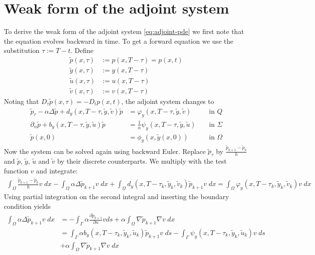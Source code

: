 \documentclass[
12pt, %
a4paper, %
onecolumn, %
portrait %
]{article}
\begin{document}
\section{Weak form of the adjoint system}
To derive the weak form of the adjoint system \eqref{eq:adjoint-pde} we first note that the equation evolves backward in time. To get a forward equation we use the substitution $\tau := T - t$.
Define
\begin{align*}
\tilde{p}(x,\tau) &:= p(x,T-\tau) = p(x,t) \\
\tilde{y}(x,\tau) &:= y(x,T-\tau) \\
\tilde{u}(x,\tau) &:= u(x,T-\tau) \\
\tilde{v}(x,\tau) &:= v(x,T-\tau)
\end{align*}
Noting that $D_{\tau}\tilde{p}(x,\tau) = -D_t p(x,t)$, the adjoint system changes to
\begin{equation}
\begin{alignedat}{2}
\tilde{p}_{\tau} - \alpha \Delta \tilde{p} + d_y(x,T-\tau,\tilde{y}, \tilde{v}) \tilde{p} &= \varphi_y(x,T-\tau,\tilde{y}, \tilde{v}) &&\text{ in } Q \\
\partial_n \tilde{p} + b_y(x,T-\tau,\tilde{y}, \tilde{u}) \tilde{p} &= \frac{1}{\alpha}\psi_y(x,T-\tau,\tilde{y}, \tilde{u}) &&\text{ in } \Sigma \\
\tilde{p}(x,0) &= \phi_y(x, \tilde{y}(x,0)) &&\text{ in } \Omega
\label{eq:adjoint-pde-time-substitution}
\end{alignedat}
\end{equation}
Now the system can be solved again using backward Euler. Replace $\tilde{p}_\tau$ by $\frac{\tilde{p}_{k+1} - \tilde{p}_k}{h}$ and $\tilde{p}$, $\tilde{y}$, $\tilde{u}$ and $\tilde{v}$ by their discrete counterparts.  We multiply with the test function $v$ and integrate:
\begin{align*}
\int_{\Omega} \frac{\tilde{p}_{k+1} - \tilde{p}_k}{h} v \; dx - \int_{\Omega} \alpha \Delta \tilde{p}_{k+1} v \; dx + \int_{\Omega} d_y(x,T-\tau_{k}, \tilde{y}_k, \tilde{v}_k) \tilde{p}_{k+1} v \; dx = \int_{\Omega} \varphi_y(x,T-\tau_k,\tilde{y}_k, \tilde{v}_k) v \; dx
\end{align*}
Using partial integration on the second integral and inserting the boundary condition yields 
\begin{align*}
\int_{\Omega} \alpha \Delta \tilde{p}_{k+1} v \; dx & = - \int_{\Gamma} \alpha \frac{\partial \tilde{p}_{k+1}}{\partial n} v ds + \alpha \int_{\Omega}  \nabla \tilde{p}_{k+1} \nabla v \; dx \\
& = \int_{\Gamma} \alpha b_y(x,T - \tau_k, \tilde{y}_k, \tilde{u}_k) \tilde{p}_{k+1} v \; ds - \int_{\Gamma} \psi_y(x,T- \tau_k, \tilde{y}_k, \tilde{u}_k) v \; ds \\
&+ \alpha \int_{\Omega} \nabla \tilde{p}_{k+1} \nabla v \; dx
\end{align*}
\end{document}

